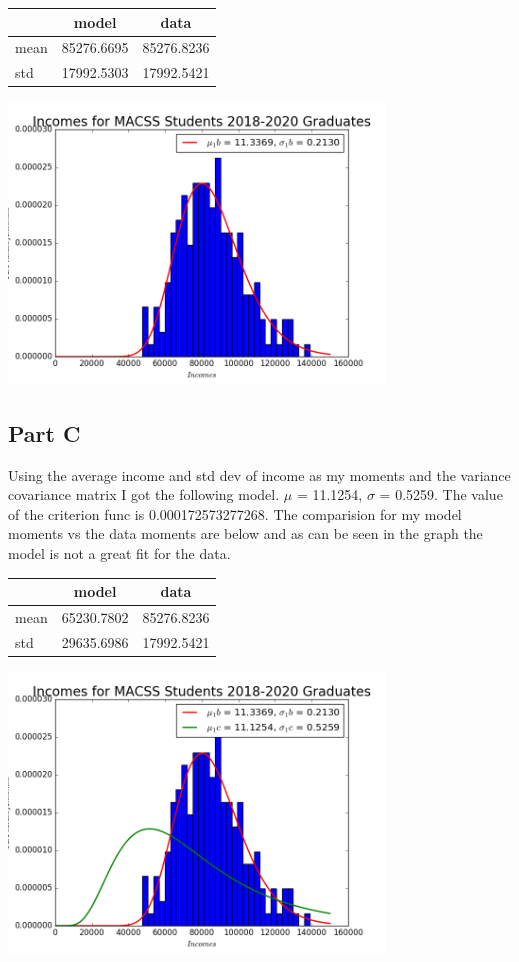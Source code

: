 \documentclass{article}
\begin{document}
\begin{center}
  \begin{tabular}{ l | c | c }
    \hline
     & model & data \\ \hline
    mean & 85276.6695 & 85276.8236 \\ \hline
    std & 17992.5303 & 17992.5421 \\
    \hline
  \end{tabular}
\end{center}
\begin{center}\includegraphics[width=100mm]{images/1b.png}\end{center}

\subsection*{Part C}
Using the average income and std dev of income as my moments and the variance covariance matrix I got the following model.  $\mu$ = 11.1254, $\sigma$ = 0.5259.  The value of the criterion func is 0.000172573277268.  The comparision for my model moments vs the data moments are below and as can be seen in the graph the model is not a great fit for the data.
\begin{center}
  \begin{tabular}{ l | c | c }
    \hline
     & model & data \\ \hline
    mean & 65230.7802 & 85276.8236 \\ \hline
    std & 29635.6986 & 17992.5421 \\
    \hline
  \end{tabular}
\end{center}
\begin{center}\includegraphics[width=100mm]{images/1c.png}\end{center}
\end{document}

